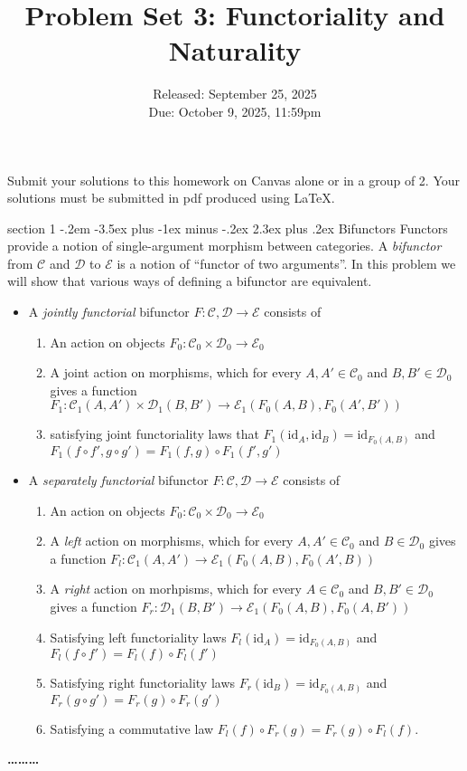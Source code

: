 \documentclass[12pt]{article}
\makeatletter
\newenvironment{problem}{\@startsection
       {section}
       {1}
       {-.2em}
       {-3.5ex plus -1ex minus -.2ex}
       {2.3ex plus .2ex}
       {\pagebreak[3]%
       \large\bf\noindent{Problem }
       }
       }
       {%
       \begin{center}\large\bf \ldots\ldots\ldots\end{center}}
\newcommand{\id}{\textrm{id}}
\newcommand{\cat}{\mathcal}
\makeatother
\begin{document}
\title{Problem Set 3: Functoriality and Naturality}
\date{Released: September 25, 2025\\
  Due: October 9, 2025, 11:59pm
}
\maketitle

Submit your solutions to this homework on Canvas alone or in a group of 2.
Your solutions must be submitted in pdf produced using LaTeX.

\begin{problem}{Bifunctors}
  Functors provide a notion of single-argument morphism between
  categories. A \emph{bifunctor} from $\cat C$ and $\cat D$ to $\cat
  E$ is a notion of ``functor of two arguments''. In this problem we
  will show that various ways of defining a bifunctor are equivalent.

  \begin{itemize}
  \item A \emph{jointly functorial} bifunctor $F : \cat C , \cat D \to \cat E$ consists of
    \begin{enumerate}
    \item An action on objects $F_0 : \cat C_0 \times \cat D_0 \to \cat E_0$
    \item A joint action on morphisms, which for every $A,A' \in \cat C_0$ and $B , B' \in \cat D_0$ gives a function $F_1 : \cat C_1(A,A')\times \cat D_1(B,B') \to \cat E_1(F_0(A,B), F_0(A',B'))$
    \item satisfying joint functoriality laws that $F_1(\id_A,\id_B) = \id_{F_0(A,B)}$ and $F_1(f \circ f', g \circ g') = F_1(f,g) \circ F_1(f',g')$
    \end{enumerate}
  \item A \emph{separately functorial} bifunctor $F : \cat C , \cat D \to \cat E$ consists of
    \begin{enumerate}
    \item An action on objects $F_0 : \cat C_0 \times \cat D_0 \to \cat E_0$
    \item A \emph{left} action on morphisms, which for every $A,A' \in \cat C_0$ and $B \in \cat D_0$ gives a function $F_l : \cat C_1(A,A') \to \cat E_1(F_0(A,B), F_0(A',B))$
    \item A \emph{right} action on morhpisms, which for every $A \in \cat C_0$ and $B,B' \in \cat D_0$ gives a function $F_r : \cat D_1(B,B') \to \cat E_1(F_0(A,B), F_0(A,B'))$
    \item Satisfying left functoriality laws $F_l(\id_A) = \id_{F_0(A,B)}$ and $F_l(f \circ f') = F_l(f) \circ F_l(f')$ 
    \item Satisfying right functoriality laws $F_r(\id_B) = \id_{F_0(A,B)}$ and $F_r(g \circ g') = F_r(g) \circ F_r(g')$
    \item Satisfying a commutative law $F_l(f) \circ F_r(g) = F_r(g)\circ F_l(f)$.
    \end{enumerate}
  \end{itemize}


\end{problem}
\end{document}

